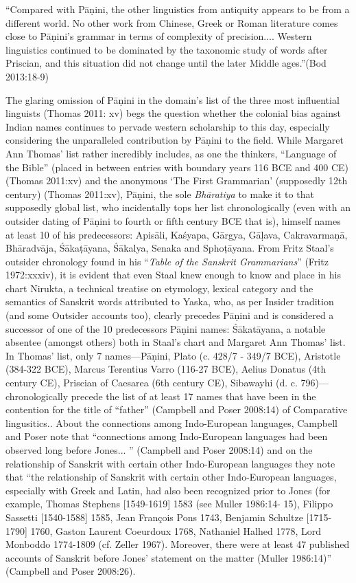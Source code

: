 \begin{myquote}
“Compared with Pāṇini, the other linguistics from antiquity appears to be from a different world. No other work from Chinese, Greek or Roman literature comes close to Pāṇini’s grammar in terms of complexity of precision.... Western linguistics continued to be dominated by the taxonomic study of words after Priscian, and this situation did not change until the later Middle ages.”\hfill (Bod 2013:18-9)
\end{myquote}

The glaring omission of Pāṇini in the domain’s list of the three most influential linguists (Thomas 2011: xv) begs the question whether the colonial bias against Indian names continues to pervade western scholarship to this day, especially considering the unparalleled contribution by Pāṇini to the field. While Margaret Ann Thomas’ list rather incredibly includes, as one the thinkers, “Language of the Bible” (placed in between entries with boundary years 116 BCE and 400 CE) (Thomas 2011:xv) and the anonymous ‘The First Grammarian’ (supposedly 12th century) (Thomas 2011:xv), Pāṇini, the sole \textit{Bhāratiya} to make it to that supposedly global list, who incidentally tops her list chronologically (even with an outsider dating of Pāṇini to fourth or fifth century BCE that is), himself names at least 10 of his predecessors: Apisāli, Kaśyapa, Gārgya, Gāḷava, Cakravarmaṇā, Bhāradvāja, Śākaṭāyana, Śākalya, Senaka and Sphoṭāyana. From Fritz Staal’s outsider chronology found in his “\textit{Table of the Sanskrit Grammarians}” (Fritz 1972:xxxiv), it is evident that even Staal knew enough to know and place in his chart Nirukta, a technical treatise on etymology, lexical category and the semantics of Sanskrit words attributed to Yaska, who, as per Insider tradition (and some Outsider accounts too), clearly precedes Pāṇini and is considered a successor of one of the 10 predecessors Pāṇini names: Śākatāyana, a notable absentee (amongst others) both in Staal’s chart and Margaret Ann Thomas’ list. In Thomas’ list, only 7 names—Pāṇini, Plato (c. 428/7 - 349/7 BCE), Aristotle (384-322 BCE), Marcus Terentius Varro (116-27 BCE), Aelius Donatus (4th century CE), Priscian of Caesarea (6th century CE), Sibawayhi (d. c. 796)—chronologically precede the list of at least 17 names that have been in the contention for the title of “father” (Campbell and Poser 2008:14) of Comparative lingusitics.. About the connections among Indo-European languages, Campbell and Poser note that “connections among Indo-European languages had been observed long before Jones... ” (Campbell and Poser 2008:14) and on the relationship of Sanskrit with certain other Indo-European languages they note that “the relationship of Sanskrit with certain other Indo-European languages, especially with Greek and Latin, had also been recognized prior to Jones (for example, Thomas Stephens [1549-1619] 1583 (see Muller 1986:14- 15), Filippo Sassetti [1540-1588] 1585, Jean François Pons 1743, Benjamin Schultze [1715-1790] 1760, Gaston Laurent Coeurdoux 1768, Nathaniel Halhed 1778, Lord Monboddo 1774-1809 (cf. Zeller 1967). Moreover, there were at least 47 published accounts of Sanskrit before Jones’ statement on the matter (Muller 1986:14)” (Campbell and Poser 2008:26). 